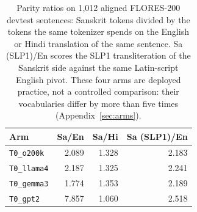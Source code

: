 \begin{table}[t]
\centering
\footnotesize
\begin{tabular}{lrrr}
\toprule
Arm & Sa/En & Sa/Hi & Sa (SLP1)/En \\
\midrule
\texttt{T0\_o200k} & 2.089 & 1.328 & 2.183 \\
\texttt{T0\_llama4} & 2.187 & 1.325 & 2.241 \\
\texttt{T0\_gemma3} & 1.774 & 1.353 & 2.189 \\
\texttt{T0\_gpt2} & 7.857 & 1.060 & 2.518 \\
\bottomrule
\end{tabular}
\caption{Parity ratios on 1,012 aligned FLORES-200 devtest sentences: Sanskrit tokens divided by the tokens the same tokenizer spends on the English or Hindi translation of the same sentence. Sa (SLP1)/En scores the SLP1 transliteration of the Sanskrit side against the same Latin-script English pivot. These four arms are deployed practice, not a controlled comparison: their vocabularies differ by more than five times (Appendix~\ref{sec:arms}).}
\label{tab:parity}
\end{table}

